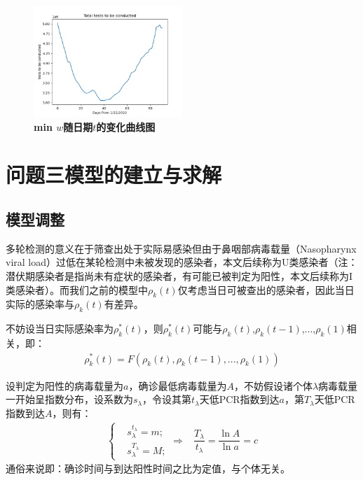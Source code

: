 \documentclass[withoutpreface,bwprint]{cumcmthesis} %
\begin{document}
\begin{figure}[H]
\centering
\includegraphics[width=0.5\textwidth]{nyc_total_tests_to_be_conducted.png}
\caption{\textbf{\rm{min} $w$随日期$t$的变化曲线图}}
\label{pro1}
\end{figure}

\section{问题三模型的建立与求解}
\subsection{模型调整}
多轮检测的意义在于筛查出处于实际易感染但由于鼻咽部病毒载量（Nasopharynx viral load）过低在某轮检测中未被发现的感染者，本文后续称为U类感染者（注：潜伏期感染者是指尚未有症状的感染者，有可能已被判定为阳性，本文后续称为I类感染者）。而我们之前的模型中$\rho_k(t)$仅考虑当日可被查出的感染者，因此当日实际的感染率与$\rho_k(t)$有差异。

不妨设当日实际感染率为$\rho^*_k(t)$，则$\rho^*_k(t)$可能与$\rho_k(t)$,$\rho_k(t-1)$,...,$\rho_k(1)$相关，即：
\begin{align}
    \rho^*_k(t) = F\left(\rho_k(t),\rho_k(t-1),...,\rho_k(1) \right)
\end{align}

设判定为阳性的病毒载量为$a$，确诊最低病毒载量为$A$，不妨假设诸个体$\lambda$病毒载量一开始呈指数分布，设系数为$s_\lambda$，令设其第$t_\lambda$天低PCR指数到达$a$，第$T_\lambda$天低PCR指数到达$A$，则有：
\begin{align}
\left\{
\begin{aligned}
    & s^{t_\lambda}_{\lambda}=m; \\
    & s^{T_\lambda}_{\lambda}=M; 
\end{aligned}
    \right.
    \Rightarrow & \dfrac{T_\lambda}{t_\lambda}=\dfrac{\ln A}{\ln a}=c
\end{align}
通俗来说即：确诊时间与到达阳性时间之比为定值，与个体无关。
\end{document}

